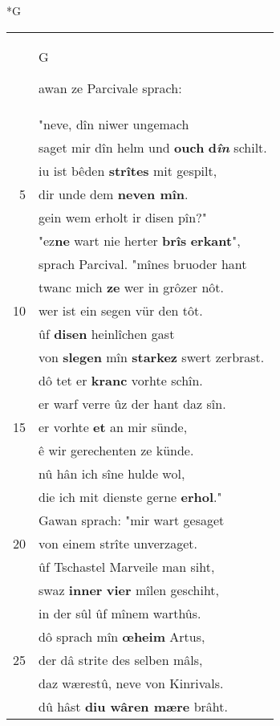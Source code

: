 \documentclass[8pt,a4paper,notitlepage]{article}
\begin{document}
\begin{table}[ht]
\begin{minipage}[t]{0.5\linewidth}
\small
\begin{center}*G
\end{center}
\begin{tabular}{rl}
 & \begin{large}G\end{large}awan ze Parcivale sprach:\\ 
 & "neve, dîn niwer ungemach\\ 
 & saget mir dîn helm und \textbf{ouch} \textbf{d\textit{în}} schilt.\\ 
 & iu ist bêden \textbf{strîtes} mit gespilt,\\ 
5 & dir unde dem \textbf{neven mîn}.\\ 
 & gein wem erholt ir disen pîn?"\\ 
 & "ez\textbf{ne} wart nie herter \textbf{brîs} \textbf{erkant}",\\ 
 & sprach Parcival. "mînes bruoder hant\\ 
 & twanc mich \textbf{ze} wer in grôzer nôt.\\ 
10 & wer ist ein segen vür den tôt.\\ 
 & ûf \textbf{disen} heinlîchen gast\\ 
 & von \textbf{slegen} mîn \textbf{starkez} swert zerbrast.\\ 
 & dô tet er \textbf{kranc} vorhte schîn.\\ 
 & er warf verre ûz der hant daz sîn.\\ 
15 & er vorhte \textbf{et} an mir sünde,\\ 
 & ê wir gerechenten ze künde.\\ 
 & nû hân ich sîne hulde wol,\\ 
 & die ich mit dienste gerne \textbf{erhol}."\\ 
 & Gawan sprach: "mir wart gesaget\\ 
20 & von einem strîte unverzaget.\\ 
 & ûf Tschastel Marveile man siht,\\ 
 & swaz \textbf{inner} \textbf{vier} mîlen geschiht,\\ 
 & in der sûl ûf mînem warthûs.\\ 
 & dô sprach mîn \textbf{œheim} Artus,\\ 
25 & der dâ strite des selben mâls,\\ 
 & daz wærestû, neve von Kinrivals.\\ 
 & dû hâst \textbf{diu wâren mære} brâht.\\ 

\end{tabular}
\end{minipage}
\end{table}
\end{document}
